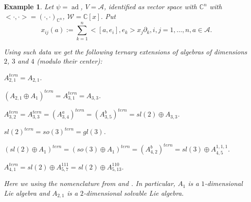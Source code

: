 \documentclass[10pt]{article}%
\numberwithin{equation}{section}
\newtheorem{example}[thm]{Example}
\newcommand{\red}{\color{red}}
\def\ad{\mathop{ad}}
\begin{document}
\begin{example}\label{ex:Ternary}
Let $\psi=\ad$, $V=\mathcal{A}$, identified as vector space with $\mathbb{C}^n$ with $<\cdot,\cdot>=(\cdot,\cdot)_{\mathbb{C}^n}$, $\mathcal{W}=\mathbb{C}[x]$.
Put 
\begin{equation*}
x_{ij}(a):=\sum\limits_{k=1}^n <[a,e_{i}],e_{k}> x_j\partial_k,i,j=1,\ldots,n,a\in\mathcal{A}.
\end{equation*}

Using such data we get the following  ternary extensions of algebras of dimensions $2$, $3$ and $4$ (modulo their center):
\begin{trivlist}
\item $A_{2,1}^{tern}=A_{2,1}$.

\item $(A_{2,1}\oplus A_1)^{tern}=A_{3,1}^{tern}=A_{3,3}$.

\item $A_{3,2}^{tern}=A_{3,3}^{tern}=(A_{3,4}^a)^{tern}=(A_{3,5}^b)^{tern}=sl(2)\oplus A_{3,3}$.

\item $sl(2)^{tern}=so(3)^{tern}=gl(3)$.

\item $(sl(2)\oplus A_1)^{tern}=(so(3)\oplus A_1)^{tern}=(A_{4,2}^b)^{tern}=sl(3)\oplus A_{4,5}^{1,1,1}$.
\item $A_{4,1}^{tern}=sl(2)\oplus A_{5,7}^{111}=sl(2)\oplus A_{5,13}^{110}$.
\end{trivlist}
Here we using the nomenclature from \cite{PBNL2003} and \cite{PSWZ76}. In particular, $A_1$ is a $1$-dimensional Lie algebra and $A_{2,1}$ is a $2$-dimensional solvable Lie algebra. 
\end{example}
\end{document}
